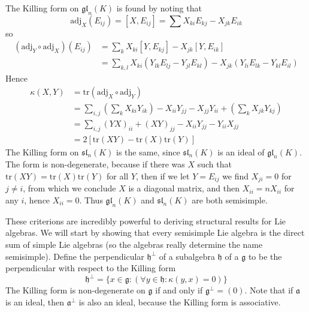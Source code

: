 \begin{example}
    The Killing form on $\mathfrak{gl}_n(K)$ is found by noting that
    \[ \text{adj}_X(E_{ij}) = [X,E_{ij}] = \sum X_{ki} E_{kj} - X_{jk} E_{ik} \]
    so
    \begin{align*}
        (\text{adj}_Y \circ \text{adj}_X)(E_{ij}) &= \sum_k X_{ki} [Y, E_{kj}] - X_{jk} [Y, E_{ik}]\\
        &= \sum_{k,l} X_{ki} (Y_{lk} E_{lj} - Y_{jl} E_{kl}) - X_{jk}(Y_{li} E_{lk} - Y_{kl} E_{il})
    \end{align*}
    Hence
    \begin{align*}
        \kappa(X,Y) &= \text{tr}(\text{adj}_X \circ \text{adj}_Y)\\
        &= \sum_{i,j} \left( \sum_k X_{ki} Y_{ik} \right) - X_{ii}Y_{jj} - X_{jj}Y_{ii} + \left( \sum_k X_{jk} Y_{kj} \right)\\
        &= \sum_{i,j} (YX)_{ii} + (XY)_{jj} - X_{ii}Y_{jj} - Y_{ii}X_{jj}\\
        &= 2 \left[ \text{tr}(XY) - \text{tr}(X) \text{tr}(Y) \right]
    \end{align*}
    The Killing form on $\mathfrak{sl}_n(K)$ is the same, since $\mathfrak{sl}_n(K)$ is an ideal of $\mathfrak{gl}_n(K)$. The form is non-degenerate, because if there was $X$ such that $\text{tr}(XY) = \text{tr}(X) \text{tr}(Y)$ for all $Y$, then if we let $Y = E_{ij}$ we find $X_{ji} = 0$ for $j \neq i$, from which we conclude $X$ is a diagonal matrix, and then $X_{ii} = n X_{ii}$ for any $i$, hence $X_{ii} = 0$. Thus $\mathfrak{gl}_n(K)$ and $\mathfrak{sl}_n(K)$ are both semisimple.
\end{example}

These criterions are incredibly powerful to deriving structural results for Lie algebras. We will start by showing that every semisimple Lie algebra is the direct sum of simple Lie algebras (so the algebras really determine the name semisimple). Define the perpendicular $\mathfrak{h}^\perp$ of a subalgebra $\mathfrak{h}$ of a $\mathfrak{g}$ to be the perpendicular with respect to the Killing form
%
\[ \mathfrak{h}^\perp = \{ x \in \mathfrak{g} : (\forall y \in \mathfrak{h}: \kappa(y,x) = 0) \} \]
%
The Killing form is non-degenerate on $\mathfrak{g}$ if and only if $\mathfrak{g}^\perp = (0)$. Note that if $\mathfrak{a}$ is an ideal, then $\mathfrak{a}^\perp$ is also an ideal, because the Killing form is associative.

